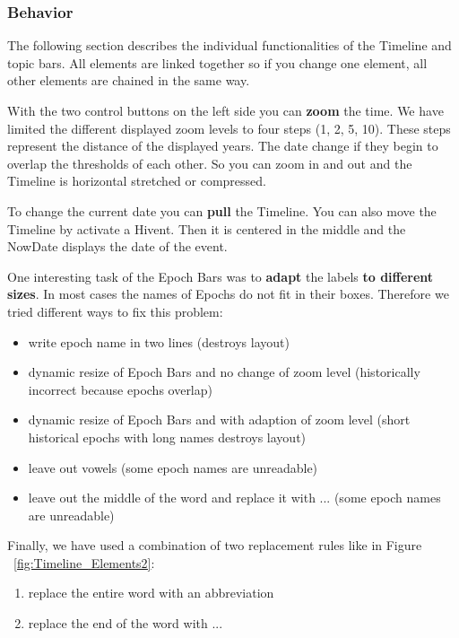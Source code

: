 \subsubsection{Behavior}
The following section describes the individual functionalities of the Timeline and topic bars. All elements are linked together so if you change one element, all other elements are chained in the same way.

With the two control buttons on the left side you can \textbf{zoom} the time. We have limited the different displayed zoom levels to four steps (1, 2, 5, 10). These steps represent the distance of the displayed years. The date change if they begin to overlap the thresholds of each other. So you can zoom in and out and the Timeline is horizontal stretched or compressed.

To change the current date you can \textbf{pull} the Timeline. You can also move the Timeline by activate a Hivent. Then it is centered in the middle and the NowDate displays the date of the event.

One interesting task of the Epoch Bars was to \textbf{adapt} the labels \textbf{to different sizes}. In most cases the names of Epochs do not fit in their boxes. Therefore we tried different ways to fix this problem:

\begin{itemize}
	\item write epoch name in two lines (destroys layout)
	\item dynamic resize of Epoch Bars and no change of zoom level (historically incorrect because epochs overlap)
	\item dynamic resize of Epoch Bars and with adaption of zoom level (short historical epochs with long names destroys layout)
	\item leave out vowels (some epoch names are unreadable)
	\item leave out the middle of the word and replace it with ... (some epoch names are unreadable)
\end{itemize}

Finally, we have used a combination of two replacement rules like in Figure ~\ref{fig:Timeline_Elements2}:

\begin{enumerate}
	\item replace the entire word with an abbreviation
	\item replace the end of the word with ...
\end{enumerate}

